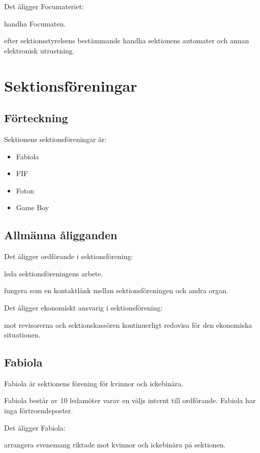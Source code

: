 \documentclass{styrdokument}
\begin{document}
\? Det åligger Focumateriet:
\begin{aligganden}
    \item handha Focumaten.
    \item efter sektionsstyrelsens bestämmande handha sektionens automater och annan elektronisk utrustning.
\end{aligganden}

\section{Sektionsföreningar}
\subsection{Förteckning}
\? Sektionens sektionsföreningar är:
\begin{itemize}
    \item Fabiola
	\item FIF
	\item Foton
	\item Game Boy
\end{itemize}

\subsection{Allmänna åligganden}
\? Det åligger ordförande i sektionsförening:
\begin{aligganden}
    \item leda sektionsföreningens arbete.
    \item fungera som en kontaktlänk mellan sektionsföreningen och andra organ.
\end{aligganden}

\? Det åligger ekonomiskt ansvarig i sektionsförening:
\begin{aligganden}
    \item mot revisorerna och sektionskassören kontinuerligt redovisa för den ekonomiska situationen.
\end{aligganden}

\subsection{Fabiola}
\? Fabiola är sektionens förening för kvinnor och ickebinära.

\? Fabiola består av 10 ledamöter varav en väljs internt till ordförande. Fabiola har inga förtroendeposter.
		
\? Det åligger Fabiola:
\begin{aligganden}
    \item arrangera evenemang riktade mot kvinnor och ickebinära på sektionen.
\end{aligganden}   %
\end{document}
